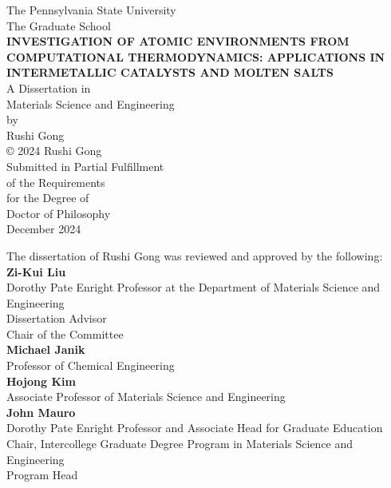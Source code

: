 \documentclass[letterpaper, 12pt]{report}
\begin{document}
\thispagestyle{empty}

{
\centering
The Pennsylvania State University\\
The Graduate School\\
\vfill
{}
{
\fontsize{14}{16}\selectfont
\textbf{INVESTIGATION OF ATOMIC ENVIRONMENTS FROM COMPUTATIONAL THERMODYNAMICS: APPLICATIONS IN INTERMETALLIC CATALYSTS AND MOLTEN SALTS}\\
}
\vfill
A Dissertation in\\
Materials Science and Engineering\\
by\\
Rushi Gong\\
\vfill
© 2024 Rushi Gong\\
\vfill
Submitted in Partial Fulfillment\\
of the Requirements\\
for the Degree of\\

\vfill
Doctor of Philosophy\\
\vfill
December 2024\\
\vfill
}

\newpage
{}
\setlength\parindent{0pt} %

The dissertation of Rushi Gong was reviewed and approved by the following:\\

\textbf{Zi-Kui Liu}\\
Dorothy Pate Enright Professor at the Department of Materials Science and Engineering\\
Dissertation Advisor\\
Chair of the Committee\\

\textbf{Michael Janik}\\
Professor of Chemical Engineering\\

\textbf{Hojong Kim}\\
Associate Professor of Materials Science and Engineering\\

\textbf{John Mauro}\\
Dorothy Pate Enright Professor and Associate Head for Graduate Education\\
Chair, Intercollege Graduate Degree Program in Materials Science and Engineering\\
Program Head
\end{document}

